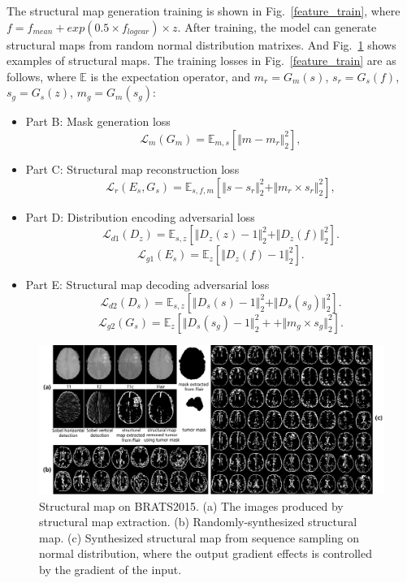 \documentclass[runningheads]{llncs}
\begin{document}
	The structural map generation training is shown in Fig.~\ref{feature_train}, where $f=f_{mean}+exp(0.5\times f_{logvar})\times z$. After training, the model can generate structural maps from random normal distribution matrixes. And Fig.~\ref{generated_f} shows examples of structural maps. The training losses in Fig.~\ref{feature_train} are as follows, where $\mathbb{E}$ is the expectation operator, and $m_r=G_m(s)$, $s_r=G_s(f)$, $s_g=G_s(z)$, $m_g=G_m(s_g)$: 
	\begin{itemize}
		\item{Part B: Mask generation loss}
		\begin{equation}
		\mathcal{L}_{m}(G_m)=\mathbb{E}_{m,s}[\Vert{m-m_r}\Vert_{2}^{2}],
		\end{equation}
		\item{Part C: Structural map reconstruction loss} 
		\begin{equation}
		\mathcal{L}_{r}(E_s,G_s)=\mathbb{E}_{s,f,m}[\Vert{s-s_r}\Vert_{2}^{2}+\Vert{m_r\times s_r}\Vert_{2}^{2}],
		\end{equation}
		\item{Part D: Distribution encoding adversarial loss} 
		\begin{equation}
		\mathcal{L}_{d1}(D_{z})=\mathbb{E}_{s,z}[\Vert{D_{z}(z)-1}\Vert_{2}^{2}+\Vert{D_{z}(f)}\Vert_{2}^{2}].
		\end{equation}
		\begin{equation}
		\mathcal{L}_{g1}(E_s)=\mathbb{E}_{z}[\Vert{D_{z}(f)-1}\Vert_{2}^{2}].	
		\end{equation}
		\item{Part E: Structural map decoding adversarial loss} 
		\begin{equation}
		\mathcal{L}_{d2}(D_{s})=\mathbb{E}_{s,z}[\Vert{D_{s}(s)-1}\Vert_{2}^{2}+\Vert{D_{s}(s_g)}\Vert_{2}^{2}].
		\end{equation}
		\begin{equation}
		\mathcal{L}_{g2}(G_s)=\mathbb{E}_{z}[\Vert{D_{s}(s_g)-1}\Vert_{2}^{2}++\Vert{m_g\times s_g}\Vert_{2}^{2}].	
		\end{equation}
	\end{itemize}
	\begin{figure}[th]
		\centering
		\includegraphics[width=1\linewidth]{figures/brats_f}
		\caption{Structural map on BRATS2015. (a) The images produced by structural map extraction. (b) Randomly-synthesized structural map. (c) Synthesized structural map from sequence sampling on normal distribution, where the output gradient effects is controlled by the gradient of the input. }
		\label{generated_f}
	\end{figure}
\end{document}
